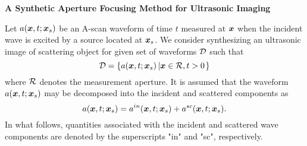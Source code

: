 ﻿\documentclass[11pt,a4j]{article}
\newlength{\minitwocolumn}
\begin{document}
\newcommand{\fat}[1]{\mbox{\boldmath $#1$}}
\newcommand{\D}{\partial}
\newcommand{\w}{\omega}
\newcommand{\ga}{\alpha}
\newcommand{\gb}{\beta}
\newcommand{\gx}{\xi}
\newcommand{\gz}{\zeta}
\newcommand{\vhat}[1]{\hat{\fat{#1}}}
\newcommand{\spc}{\vspace{0.7\baselineskip}}
\newcommand{\halfspc}{\vspace{0.3\baselineskip}}

\newcommand{\twofig}[2]
 {
   \begin{figure}[h]
     \begin{minipage}[t]{\minitwocolumn}
         \begin{center}   #1
         \end{center}
     \end{minipage}
         \hspace{\columnsep}
     \begin{minipage}[t]{\minitwocolumn}
         \begin{center} #2
         \end{center}
     \end{minipage}
   \end{figure}
 }
\begin{center}
{\Large \bf A Synthetic Aperture Focusing Method for Ultrasonic Imaging}
\end{center}
\vspace{10mm}
Let $a(\fat{x},t;\fat{x}_s)$ be an A-scan waveform of time $t$
measured at $\fat{x}$ when the incident wave is excited by a 
 source located at $\fat{x}_s$. 
 We consider synthesizing an ultrasonic image of scattering object for 
 given set of waveforms $\cal D$ such that 
\begin{equation}
	{\cal D} = \left\{
		a(\fat{x},t;\fat{x}_s)\left| \fat{x}\in {\cal R},t>0 \right.
	\right\}
	\label{eqn:bscan_data}
\end{equation}
where $\cal R$ denotes the measurement aperture.
It is assumed that the waveform $a(\fat{x},t;\fat{x}_s)$ may be decomposed into 
the incident and scattered components as 
\begin{equation}
	a(\fat{x},t;\fat{x}_s)=
	a^{in}(\fat{x},t;\fat{x}_s)
	+
	a^{sc}(\fat{x},t;\fat{x}_s).
	\label{eqn:wv_split}
\end{equation}
In what follows, quantities associated with the incident and scattered wave 
components are denoted by the superscripts "in" and "sc", respectively.
\end{document}
